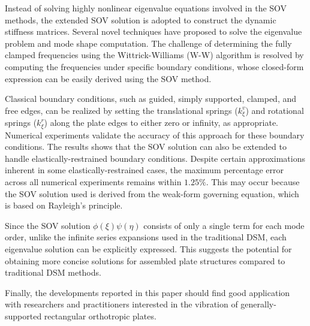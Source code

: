 \documentclass[preprint,12pt]{elsarticle}
\begin{document}
Instead of solving highly nonlinear eigenvalue equations involved in the SOV methods, the extended SOV solution is adopted to construct the dynamic stiffness matrices.
Several novel techniques have proposed to solve the eigenvalue problem and mode shape computation.
The challenge of determining the fully clamped frequencies using the Wittrick-Williams (W-W) algorithm is resolved by computing the frequencies under specific boundary conditions, whose closed-form expression can be easily derived using the SOV method.  

Classical boundary conditions, such as guided, simply supported, clamped, and free edges, can be realized by setting the translational springs ($k^v_\xi$) and rotational springs ($k^r_\xi$) along the plate edges to either zero or infinity, as appropriate.  
Numerical experiments validate the accuracy of this approach for these boundary conditions.  
The results shows that the SOV solution can also be extended to handle elastically-restrained boundary conditions.
Despite certain approximations inherent in some elastically-restrained cases, the maximum percentage error across all numerical experiments remains within $1.25\%$. 
This may occur because the SOV solution used is derived from the weak-form governing equation, which is based on Rayleigh's principle.  

Since the SOV solution $\phi(\xi) \psi(\eta)$ consists of only a single term for each mode order, unlike the infinite series expansions used in the traditional DSM, each eigenvalue solution can be explicitly expressed.  
This suggests the potential for obtaining more concise solutions for assembled plate structures compared to traditional DSM methods. 

Finally, the developments reported in this paper should find good application with researchers and practitioners interested in the vibration of generally-supported rectangular orthotropic plates.
\end{document}
